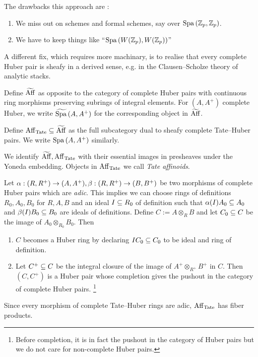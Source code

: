 \documentclass{article}
\begin{document}
The drawbacks this approach are : 
\begin{enumerate}
  \item We miss out on schemes and formal schemes,
  say over $\mathrm{Spa}\,(\mathbb{Z}_p , \mathbb{Z}_p)$.
  \item We have to keep things like ``$\mathrm{Spa}\,(W(\mathbb{Z}_p) , W(\mathbb{Z}_p))$''
\end{enumerate}
A different fix, which requires more machinary,
is to realise that
every complete Huber pair is sheafy in a derived sense,
e.g. in the Clausen--Scholze theory of analytic stacks.
\begin{dfn}
  
  Define $\widetilde{\mathrm{Aff}}$ as
  opposite to the category of complete Huber pairs
  with continuous ring morphisms preserving subrings of integral elements.
  For $(A , A^+)$ complete Huber,
  we write $\widetilde{\mathrm{Spa}\,}(A , A^+)$ for the corresponding object in
  $\widetilde{\mathrm{Aff}}$.

  Define $\mathrm{Aff}_{\mathrm{Tate}} \subseteq \widetilde{\mathrm{Aff}}$ as the full subcategory
  dual to sheafy complete Tate--Huber pairs.
  We write $\mathrm{Spa}\, (A , A^+)$ similarly.

  We identify $\widetilde{\mathrm{Aff}} , \mathrm{Aff}_{\mathrm{Tate}}$ with
  their essential images in presheaves under the Yoneda embedding.
  Objects in $\mathrm{Aff}_{\mathrm{Tate}}$ we call \emph{Tate affinoids}.
\end{dfn}

\begin{prop}
  
  Let $\alpha : (R , R^+) \to (A , A^+), \beta : (R , R^+) \to (B , B^+)$ 
  be two morphisms 
  of complete Huber pairs which are \emph{adic}.
  This implies we can choose
  rings of definitions $R_0 , A_0 , B_0$ for $R , A , B$
  and an ideal $I \subseteq R_0$ of definition such that
  $\alpha(I) A_0 \subseteq A_0$ and $\beta(I) B_0 \subseteq B_0$ are ideals of definitions.
  Define $C := A \otimes_R B$
  and let $C_0 \subseteq C$ be the image of $ A_0 \otimes_{R_0} B_0$.
  Then \begin{enumerate}
    \item $C$ becomes a Huber ring by declaring $I C_0 \subseteq C_0$
    to be ideal and ring of definition.
    \item Let $C^+ \subseteq C$ be the integral closure of 
    the image of $A^+ \otimes_{R^+} B^+$ in $C$.
    Then $(C , C^+)$ is a Huber pair
    whose completion gives the pushout
    in the category of complete Huber pairs.
    \footnote{
      Before completion, it is in fact the pushout in
      the category of Huber pairs but we do not care for non-complete
      Huber pairs.
    }
  \end{enumerate}
  Since every morphism of complete Tate--Huber rings are adic,
  $\mathrm{Aff}_{\mathrm{Tate}}$ has fiber products.
  \cite[Lem. 5.1.2]{SW20}
\end{prop}
\end{document}
